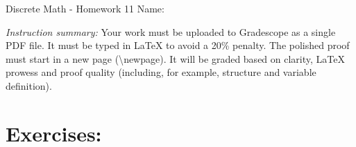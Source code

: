 \documentclass[12pt]{article}
\begin{document}
\begin{center}
    {\LARGE Discrete Math - Homework 11}  \Large \newline
    Name:
\end{center}

\noindent \emph{Instruction summary:} Your work must be uploaded to Gradescope as a single PDF file. It must be typed in LaTeX to avoid a 20\% penalty. The polished proof must start in a new page (\textbackslash{newpage}). It will be graded based on clarity, LaTeX prowess and proof quality (including, for example, structure and variable definition).

\section*{Exercises:}
\end{document}
